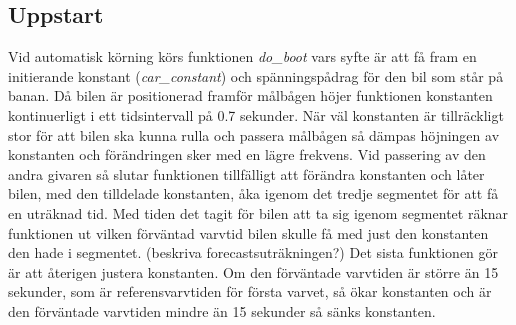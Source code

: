 \subsection{Uppstart} 

Vid automatisk körning körs funktionen \emph{do\_boot} vars syfte är att få fram
en initierande konstant (\emph{car\_constant}) och spänningspådrag för den bil
som står på banan. Då bilen är positionerad framför målbågen höjer funktionen
konstanten kontinuerligt i ett tidsintervall på 0.7 sekunder. När väl konstanten
är tillräckligt stor för att bilen ska kunna rulla och passera målbågen så
dämpas höjningen av konstanten och förändringen sker med en lägre frekvens. Vid
passering av den andra givaren så slutar funktionen tillfälligt att förändra
konstanten och låter bilen, med den tilldelade konstanten, åka igenom det tredje
segmentet för att få en uträknad tid. Med tiden det tagit för bilen att ta sig
igenom segmentet räknar funktionen ut vilken förväntad varvtid bilen skulle få
med just den konstanten den hade i segmentet. (beskriva forecastsuträkningen?)
Det sista funktionen gör är att återigen justera konstanten. Om den förväntade
varvtiden är större än 15 sekunder, som är referensvarvtiden för första varvet,
så ökar konstanten och är den förväntade varvtiden mindre än 15 sekunder så
sänks konstanten. 
